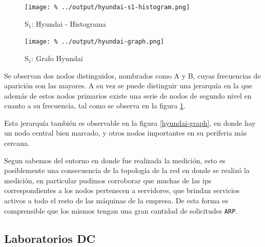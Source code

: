 \documentclass[final,inline,a4paper,narroweqnarray]{ieee}
\begin{document}
    \begin{figure}[H]\begin{center}
      \texttt{[image: \%
      ../output/hyundai-s1-histogram.png]}
      \vspace{-2em}
      \caption{S$_1$: Hyundai - Histograma}
      \label{hyundai-s1-histogram}
    \end{center}\end{figure}

    \begin{figure}[H]\begin{center}
      \texttt{[image: \%
      ../output/hyundai-graph.png]}
      \caption{S$_1$: Grafo Hyundai}
      \label{huyndai-graph}
    \end{center}\end{figure}
  
  Se observan dos nodos distinguidos, nombrados como A y B, cuyas
  frecuencias de aparición son las mayores. A su vez se puede distinguir una
  jerarquía en la que además de estos nodos primarios existe una serie de
  nodos de segundo nivel en cuanto a su frecuencia, tal como se observa en
  la figura \ref{hyundai-s1-histogram}.

  Esta jerarquía también es observable en la figura \ref{hyundai-graph}, en
  donde hay un nodo central bien marcado, y otros nodos importantes  en su periferia más
  cercana.

  Segun sabemos del entorno en donde fue realizada la medición, esto es
  posiblemente una consecuencia de la topología de la red en donde se
  realizó la medición, en particular pudimos corroborar que muchas de las
  ips correspondientes a los nodos pertenecen a servidores, que brindan
  servicios activos a todo el resto de las máquinas de la empresa. De esta
  forma es comprensible que los mismos tengan una gran cantidad de
  solicitudes \texttt{ARP}.

  \subsection{Laboratorios DC}
\end{document}
